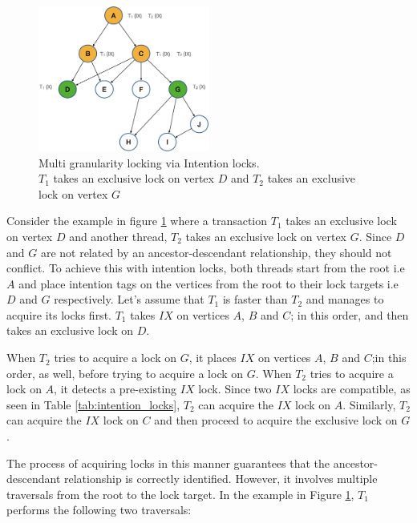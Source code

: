 \begin{figure}[h]
    \centering
    \captionsetup{justification=centering}
    \includegraphics[width=0.5\textwidth]{figures/IntentionLockExample.png}
    \caption{Multi granularity locking via Intention locks. \\ $T_1$ takes an exclusive lock on vertex $D$ and $T_2$ takes an exclusive lock on vertex $G$ }
    \label{fig:intention_lock_example}
\end{figure}

Consider the example in figure \ref{fig:intention_lock_example} where a transaction $T_1$ takes an exclusive lock on vertex $D$ and another thread, $T_2$ takes an exclusive lock on vertex $G$. 
Since $D$ and $G$ are not related by an ancestor-descendant relationship, they should not conflict.
To achieve this with intention locks, both threads start from the root i.e $A$ and place intention tags on the vertices from the root to their lock targets i.e $D$ and $G$ respectively. 
Let's assume that $T_1$ is faster than $T_2$ and manages to acquire its locks first. 
$T_1$ takes $IX$ on vertices $A$, $B$ and $C$; in this order, and then takes an exclusive lock on $D$. 

When $T_2$ tries to acquire a lock on $G$, it places $IX$ on vertices $A$, $B$ and $C$;in this order, as well, before trying to acquire a lock on $G$. 
When $T_2$ tries to acquire a lock on $A$, it detects a pre-existing  $IX$ lock. 
Since two $IX$ locks are compatible, as seen in Table \ref{tab:intention_locks}, $T_2$ can acquire the $IX$ lock on $A$.
Similarly, $T_2$ can acquire the $IX$ lock on $C$ and then proceed to acquire the exclusive lock on $G$.


The process of acquiring locks in this manner guarantees that the ancestor-descendant relationship is correctly identified. 
However, it involves multiple traversals from the root to the lock target. 
In the example in Figure \ref{fig:intention_lock_example}, $T_1$ performs the following two traversals:

